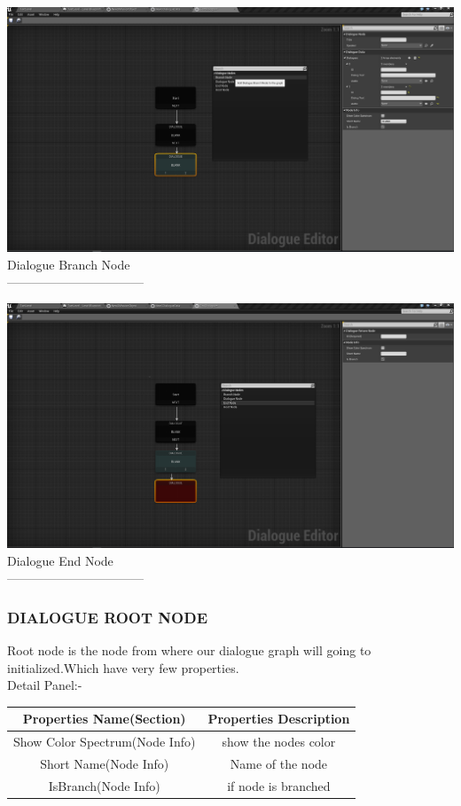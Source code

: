 \documentclass[12pt]{article}
\begin{document}
	    \begin{center}
	  \includegraphics[scale=0.2]{DialogueBranchNode.png}\\
	  Dialogue Branch Node\\
	  ---------------------------------
	  \end{center}
	    \begin{center}
	  \includegraphics[scale=0.2]{DialogueEndNode.png}\\
	  Dialogue End Node\\
	  ---------------------------------
	  \end{center}
	  \subsubsection{DIALOGUE ROOT NODE}
	  Root node is the node from where our dialogue graph will going to initialized.Which have very few properties.\\
	  Detail Panel:- \\
	  \begin{center}
	  	\begin{tabular}{|c|c|}\hline
	  		Properties Name(Section) & Properties Description\\\hline\hline 
	  		Show Color Spectrum(Node Info) & show the nodes 					color\\\hline
			Short Name(Node Info) & Name of the node\\\hline
			IsBranch(Node Info) & if node is branched\\\hline
	  	\end{tabular}
	  \end{center}
\end{document}
